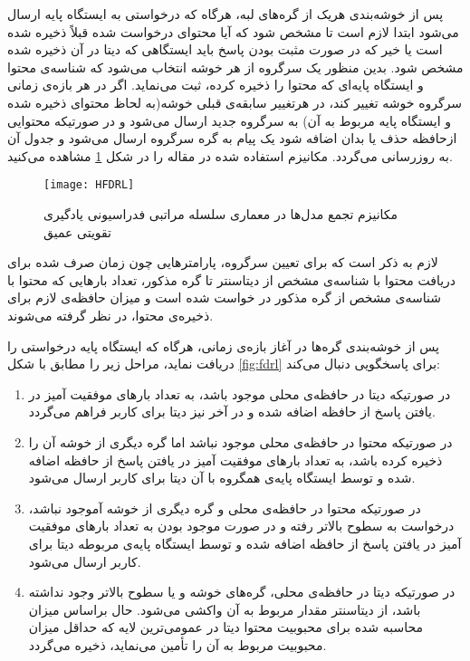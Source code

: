 پس از خوشه‌بندی هریک از گره‌های لبه،‌ هرگاه که درخواستی به ایستگاه پایه ارسال می‌شود ابتدا لازم است تا مشخص شود که آیا محتوای درخواست شده قبلاً ذخیره شده است یا خیر که در صورت مثبت بودن پاسخ باید ایستگا‌هی که دیتا در آن ذخیره شده مشخص شود. بدین منظور یک سرگروه از هر خوشه انتخاب می‌شود که شناسه‌ی محتوا و ایستگاه پایه‌ای که محتوا را ذخیره کرده، ثبت می‌نماید. اگر در هر بازه‌ی زمانی سرگروه خوشه تغییر کند، در هرتغییر سابقه‌ی قبلی خوشه(به لحاظ محتوای ذخیره شده و ایستگاه پایه مربوط به آن) به سرگروه جدید ارسال می‌شود و در صورتیکه محتوایی ازحافظه حذف یا بدان اضافه شود یک پیام به گره سرگروه ارسال می‌شود و جدول آن به روزرسانی می‌گردد. مکانیزم استفاده شده در مقاله را در شکل \ref{fig:hfdrl} مشاهده می‌کنید.

\begin{figure}[ht]
	\centerline{\texttt{[image: HFDRL]}}
	\caption{مکانیزم تجمع مدل‌ها در معماری سلسله مراتبی فدراسیونی یادگیری تقویتی عمیق}
	\label{fig:hfdrl}
\end{figure}

 لازم به ذکر است که برای تعیین سرگروه، پارامترهایی چون زمان صرف شده برای دریافت محتوا با شناسه‌ی مشخص از دیتاسنتر تا گره مذکور، تعداد بارهایی که محتوا با شناسه‌ی مشخص از گره مذکور در خواست شده است و میزان حافظه‌ی لازم برای ذخیره‌ی محتوا، در نظر گرفته می‌شوند.
 
 پس از خوشه‌بندی گره‌ها در آغاز بازه‌ی زمانی،‌ هرگاه که ایستگاه پایه درخواستی را دریافت نماید، مراحل زیر را مطابق با شکل \ref{fig:fdrl} برای پاسخگویی دنبال می‌کند:
 \begin{enumerate}
 	\item 
 	در صورتیکه دیتا در حافظه‌ی محلی موجود باشد، به تعداد بارهای موفقیت آمیز در یافتن پاسخ از حافظه اضافه شده و در آخر نیز دیتا برای کاربر فراهم می‌گردد.
 	\item 
 	در صورتیکه محتوا در حافظه‌ی محلی موجود نباشد اما گره دیگری از خوشه آن را ذخیره کرده باشد، به تعداد بارهای موفقیت آمیز در یافتن پاسخ از حافظه اضافه شده و توسط ایستگاه پایه‌ی همگروه با آن دیتا برای کاربر ارسال می‌شود.
 	\item 
 	در صورتیکه محتوا در حافظه‌ی محلی و گره دیگری از خوشه آموجود نباشد، درخواست به سطوح بالاتر رفته و در صورت موجود بودن به تعداد بارهای موفقیت آمیز در یافتن پاسخ از حافظه اضافه شده و توسط ایستگاه پایه‌ی مربوطه دیتا برای کاربر ارسال می‌شود.
 	\item 
 	در صورتیکه دیتا در حافظه‌ی محلی،‌ گره‌های خوشه و یا سطوح بالاتر وجود نداشته باشد، از دیتاسنتر مقدار مربوط به آن واکشی می‌شود. حال براساس میزان محاسبه شده برای محبوبیت محتوا دیتا در عمومی‌ترین لایه که حداقل میزان محبوبیت مربوط به آن را تأمین می‌نماید، ذخیره می‌گردد. 
 \end{enumerate}

